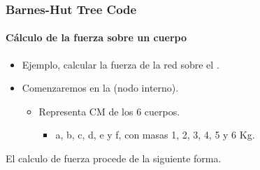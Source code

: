 \frame
{
\frametitle{Barnes-Hut Tree Code}
\framesubtitle{Cálculo de la fuerza sobre un cuerpo}

\begin{itemize}
	\item Ejemplo, calcular la fuerza de la red sobre el .
	\item Comenzaremos en la  (nodo interno).
	\begin{itemize}
		\item Representa CM de los 6 cuerpos.
		 \begin{itemize}
		 	\item a, b, c, d, e y f, con masas 1, 2, 3, 4, 5 y 6 Kg.
		 \end{itemize}
	\end{itemize}
\end{itemize}
El calculo de fuerza procede de la siguiente forma.
}

